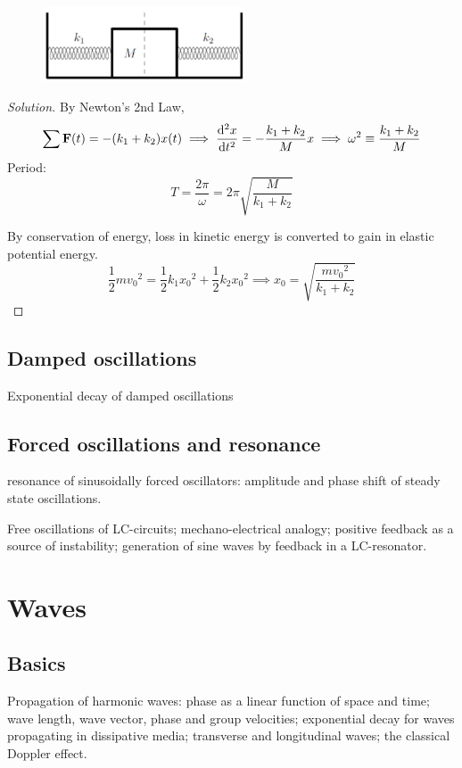 \begin{figure}[H]
    \centering
    \includegraphics[width=6cm]{images/two_springs.png}
\end{figure}

\begin{proof}[Solution]
By Newton's 2nd Law,
\[ \sum\vb{F}(t)=-(k_1+k_2)x(t) \implies \dv[2]{x}{t}=-\frac{k_1+k_2}{M}x \implies \omega^2\equiv\frac{k_1+k_2}{M} \]
Period:
\[ \boxed{T=\frac{2\pi}{\omega}=2\pi\sqrt{\frac{M}{k_1+k_2}}} \]

By conservation of energy, loss in kinetic energy is converted to gain in elastic potential energy.
\[ \frac{1}{2}m{v_0}^2 = \frac{1}{2}k_1{x_0}^2 + \frac{1}{2}k_2{x_0}^2 \implies \boxed{x_0 = \sqrt{\frac{m{v_0}^2}{k_1+k_2}}} \]
\end{proof}
\pagebreak

\section{Damped oscillations}
Exponential decay of damped oscillations

\section{Forced oscillations and resonance}
resonance of sinusoidally forced oscillators: amplitude and phase shift of steady state oscillations. 

Free oscillations of LC-circuits; mechano-electrical analogy; positive feedback as a source of instability; generation of sine waves by feedback in a LC-resonator.


\chapter{Waves}
\section{Basics}
Propagation of harmonic waves: phase as a linear function of space and time; wave length, wave vector, phase and group velocities; exponential decay for waves propagating in dissipative media; transverse and longitudinal waves; the classical Doppler effect.

